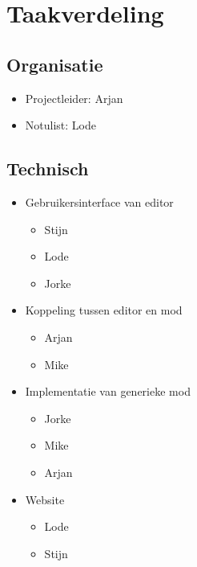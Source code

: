 \documentclass{article}
\begin{document}
\newpage

\section{Taakverdeling}
	\subsection{Organisatie}
	\begin{itemize}
		\item Projectleider: Arjan
		\item Notulist: Lode
	\end{itemize}
	\subsection{Technisch}
	\begin{itemize}
		\item Gebruikersinterface van editor
		\begin{itemize}
			\item Stijn
			\item Lode
			\item Jorke
		\end{itemize}
		\item Koppeling tussen editor en mod
		\begin{itemize}
			\item Arjan
			\item Mike
		\end{itemize}
		\item Implementatie van generieke mod
		\begin{itemize}
			\item Jorke
			\item Mike
			\item Arjan
		\end{itemize}
		\item Website
		\begin{itemize}
			\item Lode
			\item Stijn
		\end{itemize}
	\end{itemize}

\newpage
\end{document}
